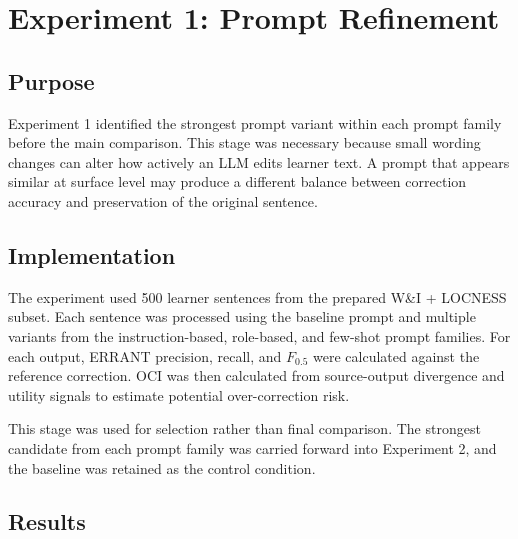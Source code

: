 \section{Experiment 1: Prompt Refinement}

\subsection{Purpose}

Experiment 1 identified the strongest prompt variant within each prompt family before the main comparison. This stage was necessary because small wording changes can alter how actively an LLM edits learner text. A prompt that appears similar at surface level may produce a different balance between correction accuracy and preservation of the original sentence.

\subsection{Implementation}

The experiment used 500 learner sentences from the prepared W\&I + LOCNESS subset. Each sentence was processed using the baseline prompt and multiple variants from the instruction-based, role-based, and few-shot prompt families. For each output, ERRANT precision, recall, and $F_{0.5}$ were calculated against the reference correction. OCI was then calculated from source-output divergence and utility signals to estimate potential over-correction risk.

This stage was used for selection rather than final comparison. The strongest candidate from each prompt family was carried forward into Experiment 2, and the baseline was retained as the control condition.

\subsection{Results}

